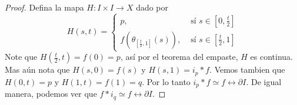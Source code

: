 \begin{proof}
     Defina la mapa $H:I \times I \xrightarrow{} X$ dado por
     \begin{equation*}
          H(s,t)=\begin{cases}
                    p, & \text{ s\'i } s \in [0,\frac{t}{2}]    \\
                    f(\theta_{[\frac{t}{2},1]}(s)), & \text{ s\'i } s \in
                    [\frac{t}{2},1]
                 \end{cases}
     \end{equation*}
     Note que $H(\frac{t}{2},t)=f(0)=p$, as\'i por el teorema del empaste, $H$
     es continua. Mas a\'un nota que $H(s,0)=f(s)$ y $H(s,1)=i_p \ast f$. Vemos
     tambien que $H(0,t)=p$ y $H(1,t)=f(1)=q$. Por lo tanto $i_p \ast f \simeq f
     \rel{\partial{I}}$. De igual manera, podemos ver que $f \ast i_q \simeq f
     \rel{\partial{I}}$.


\end{proof}
